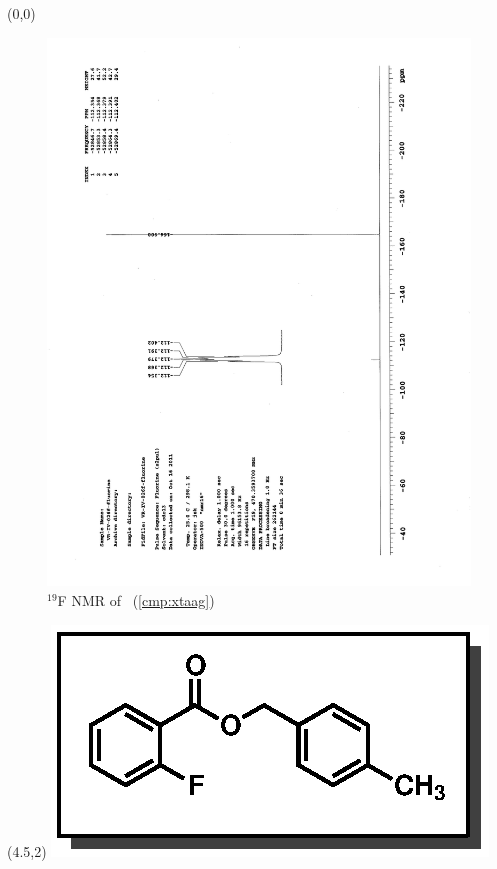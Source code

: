 \clearpage
\begin{textblock}{20}(0,0)
\begin{figure}[htb]
\caption{$^{19}$F NMR of  \CMPxtaag\ (\ref{cmp:xtaag})}
\includegraphics[scale=0.75, trim = 0mm 0mm 0mm 5mm,
clip]{chp_asymmetric/images/nmr/xtaagF}
\vspace{-100pt}
\end{figure}
\end{textblock}
\begin{textblock}{1}(4.5,2)
\includegraphics[scale=0.8, angle=90]{chp_asymmetric/images/xtaag}
\end{textblock}
\clearpage

